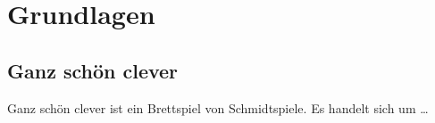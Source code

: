 \section{Grundlagen}
\subsection{Ganz schön clever}
	Ganz schön clever ist ein Brettspiel von Schmidtspiele. Es handelt sich um \dots